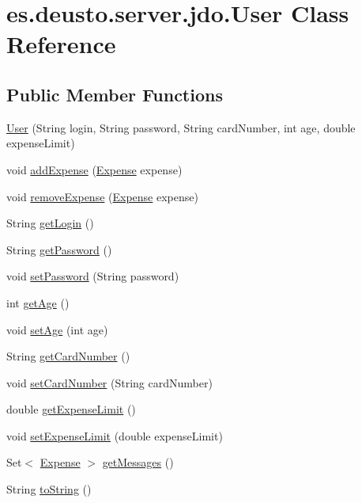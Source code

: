 \hypertarget{classes_1_1deusto_1_1server_1_1jdo_1_1_user}{}\section{es.\+deusto.\+server.\+jdo.\+User Class Reference}
\label{classes_1_1deusto_1_1server_1_1jdo_1_1_user}
\subsection*{Public Member Functions}
\begin{DoxyCompactItemize}
\item 
\hyperlink{classes_1_1deusto_1_1server_1_1jdo_1_1_user_ae35fdda3d2752485c075bc12679a917a}{User} (String login, String password, String card\+Number, int age, double expense\+Limit)
\item 
void \hyperlink{classes_1_1deusto_1_1server_1_1jdo_1_1_user_a8a3a248ef33c0833a482d95150dde9df}{add\+Expense} (\hyperlink{classes_1_1deusto_1_1server_1_1jdo_1_1_expense}{Expense} expense)
\item 
void \hyperlink{classes_1_1deusto_1_1server_1_1jdo_1_1_user_a2ecb8023580fdee24c3f6d6a28b23a86}{remove\+Expense} (\hyperlink{classes_1_1deusto_1_1server_1_1jdo_1_1_expense}{Expense} expense)
\item 
String \hyperlink{classes_1_1deusto_1_1server_1_1jdo_1_1_user_aad8107ea8f9281199377f705d541bf8e}{get\+Login} ()
\item 
String \hyperlink{classes_1_1deusto_1_1server_1_1jdo_1_1_user_a1900ee126da22ed0f043e0077e8be049}{get\+Password} ()
\item 
void \hyperlink{classes_1_1deusto_1_1server_1_1jdo_1_1_user_a2e052b5a7cab949f61580edf44bbd233}{set\+Password} (String password)
\item 
int \hyperlink{classes_1_1deusto_1_1server_1_1jdo_1_1_user_a4756305bae572130c76f8d152702d223}{get\+Age} ()
\item 
void \hyperlink{classes_1_1deusto_1_1server_1_1jdo_1_1_user_adc28a24f0a24c86ca31b10d8ffb23232}{set\+Age} (int age)
\item 
String \hyperlink{classes_1_1deusto_1_1server_1_1jdo_1_1_user_a6bbcffd72c92af51ba68625d9468b2a0}{get\+Card\+Number} ()
\item 
void \hyperlink{classes_1_1deusto_1_1server_1_1jdo_1_1_user_a5d9f161786d9f77554530b3538629808}{set\+Card\+Number} (String card\+Number)
\item 
double \hyperlink{classes_1_1deusto_1_1server_1_1jdo_1_1_user_a2c7f63a2e482c0037381990454289dfc}{get\+Expense\+Limit} ()
\item 
void \hyperlink{classes_1_1deusto_1_1server_1_1jdo_1_1_user_acb8264d9e7fd3f2ba112f66ddc28ddeb}{set\+Expense\+Limit} (double expense\+Limit)
\item 
Set$<$ \hyperlink{classes_1_1deusto_1_1server_1_1jdo_1_1_expense}{Expense} $>$ \hyperlink{classes_1_1deusto_1_1server_1_1jdo_1_1_user_ab92d6e8b0d6a275a2649ed10235fe9d9}{get\+Messages} ()
\item 
String \hyperlink{classes_1_1deusto_1_1server_1_1jdo_1_1_user_a65366a578a6dcc53e3a77d6eabbbf8cf}{to\+String} ()
\end{DoxyCompactItemize}


